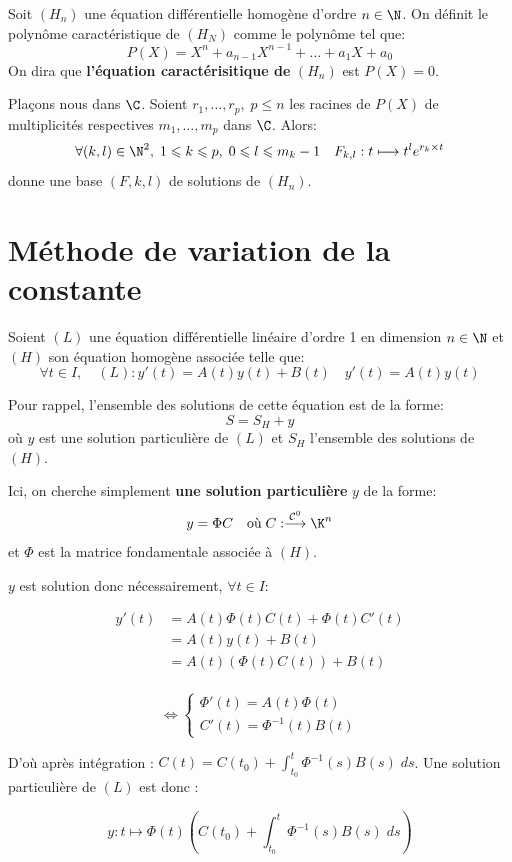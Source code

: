 \begin{definition}
	Soit $(H_n)$ une équation différentielle homogène d'ordre $ n \in  \N$. 
	On définit le polynôme caractéristique de $(H_N)$ comme le polynôme tel que: 
		\[ P(X) = X^n + a_{n-1} X^{n-1} + \dots + a_1 X + a_0 \] 
	On dira que \textbf{l'équation caractérisitique de} $(H_n)$ est $P(X) = 0$. 
\end{definition} 

\begin{theorem} 
	Plaçons nous dans $\C$. Soient $r_1, \dots, r_p, \; p \leqslant n$ les racines de $P(X)$ de multiplicités 
	respectives $m_1, \dots, m_p$ dans $\C$. Alors: 
		\[ \forall (k,l) \in  \N^2, \; 1 \leqslant k \leqslant p, \; 0 \leqslant l \leqslant m_k -1 
			\quad F_{k,l} : t \longmapsto t^l e^{r_k \times t} \]
	donne une base $(F,k,l)$ de solutions de $(H_n)$. 
\end{theorem} 



\section{Méthode de variation de la constante} 

Soient $(L)$ une équation différentielle linéaire d'ordre 1 en dimension $n \in  \N$
et $(H)$ son équation homogène associée telle que: 
	\[ \forall t \in I, \quad (L) : y'(t) = A(t) y(t) + B(t) \quad y'(t) = A(t) y(t) \] 

Pour rappel, l'ensemble des solutions de cette équation est de la forme: 
	\[ S = S_H + y \] 
où $y$ est une solution particulière de $(L)$ et $S_H$ l'ensemble des solutions de $(H)$. 

Ici, on cherche simplement \textbf{une solution particulière} $y$ de la forme: 
	\[ y = \Phi C \quad \text{où} \; C : \overset{ \mathcal{C}^0}{\longrightarrow} \K^n \] 
et $\Phi$ est la matrice fondamentale associée à $(H)$. 

$y$ est solution donc nécessairement, $ \forall t \in I$: 

\begin{align*}
	y'(t) &= A(t) \Phi(t) C(t) + \Phi(t) C'(t) \\ 
			&= A(t) y(t) + B(t) \\ 
			&= A(t) \left( \Phi(t) C(t) \right) + B(t)  \\ 
\end{align*}

\[ \iff 
\begin{cases}
	\Phi'(t) = A(t) \Phi(t) \\ 
	C'(t) = \Phi^{-1}(t) B(t)
\end{cases} \] 

D'où après intégration : $ C(t) = C(t_0) + \int_{t_0}^{t} \Phi^{-1}(s) B(s) \; ds $. 
Une solution particulière de $(L)$ est donc :

	\[ \boxed{ y : t \longmapsto \Phi(t) \left( C(t_0) + \int_{t_0}^{t} \Phi^{-1}(s) B(s) \; ds \right) } \] 






